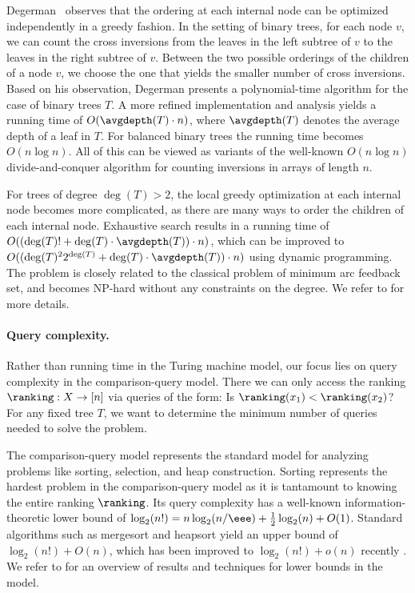 Degerman~\cite{Degerman1982} observes that the ordering at each internal node can be optimized %
%
independently in a greedy fashion. In the setting of binary trees, for each node $v$, we can count the cross inversions from the leaves in the left subtree of $v$ to the leaves in the right subtree of $v$. Between the two possible orderings of the children of a node $v$, we choose the one that yields the smaller number of cross inversions. 
Based on his observation, Degerman presents a polynomial-time algorithm for the case of binary trees $T$. A more refined implementation and analysis yields a running time of $O(\avgdepth(T) \cdot n)$, where $\avgdepth(T)$ denotes the average depth of a leaf in $T$. For balanced binary trees the running time becomes $O(n \log n)$. All of this can be viewed as variants of the well-known $O(n \log n)$ divide-and-conquer algorithm for counting inversions in arrays of length $n$.

For trees of degree $\deg(T) > 2$, the local greedy optimization at each internal node becomes more complicated, as there are many ways to order the children of each internal node. Exhaustive search results in a running time of $O((\deg(T)! + \deg(T) \cdot \avgdepth(T)) \cdot n)$, which can be improved to $O((\deg(T)^2 2^{\deg(T)} + \deg(T) \cdot \avgdepth(T)) \cdot n)$ using dynamic programming. The problem is closely related to the classical problem of minimum arc feedback set, and becomes NP-hard without any constraints on the degree. We refer to  for more details.

\paragraph{Query complexity.}
Rather than running time in the Turing machine model, our focus lies on query complexity in the comparison-query model. There we can only access the ranking $\ranking: X \to [n]$ via queries of the form: Is $\ranking(x_1) < \ranking(x_2)$? For any fixed tree $T$, we want to determine the minimum number of queries needed to solve the problem. 

The comparison-query model represents the standard model for analyzing problems like sorting, selection, and heap construction. Sorting represents the hardest problem in the comparison-query model as it is tantamount to knowing the entire ranking $\ranking$. Its query complexity has a well-known information-theoretic lower bound of $\log_2(n!) = n \log_2(n/\eee) + \frac{1}{2} \log_2(n) + O(1)$. Standard algorithms such as mergesort and heapsort yield an upper bound of $\log_2(n!) + O(n)$, which has been improved to $\log_2(n!) + o(n)$ recently \cite{Sergeev2020}.
We refer to  for an overview of results and techniques for lower bounds in the model.

